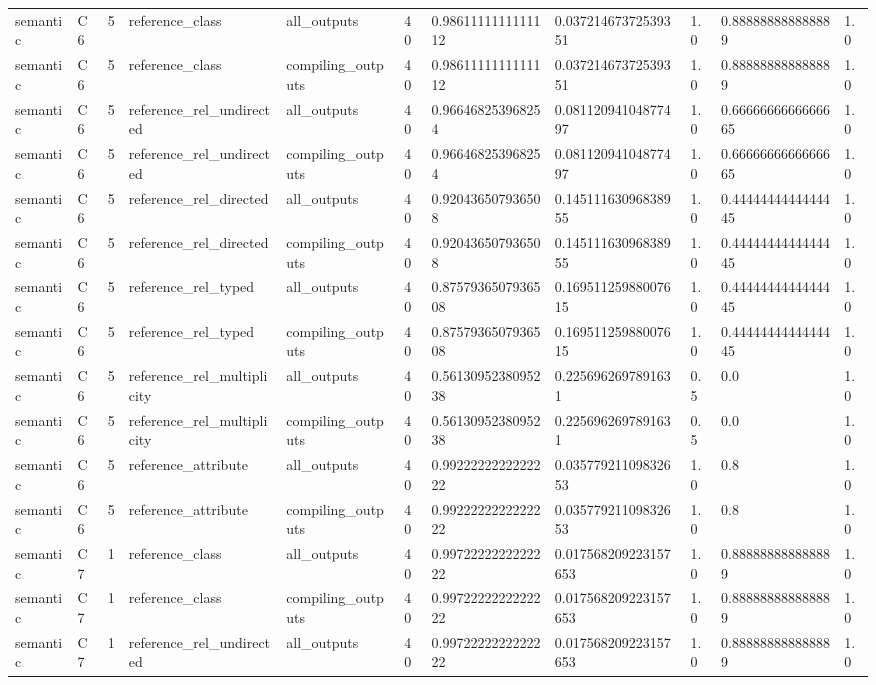 \begin{tabular}{lllllllllll}
semantic & C6 & 5 & reference\_class & all\_outputs & 40 & 0.9861111111111112 & 0.03721467372539351 & 1.0 & 0.888888888888889 & 1.0 \\
semantic & C6 & 5 & reference\_class & compiling\_outputs & 40 & 0.9861111111111112 & 0.03721467372539351 & 1.0 & 0.888888888888889 & 1.0 \\
semantic & C6 & 5 & reference\_rel\_undirected & all\_outputs & 40 & 0.966468253968254 & 0.08112094104877497 & 1.0 & 0.6666666666666665 & 1.0 \\
semantic & C6 & 5 & reference\_rel\_undirected & compiling\_outputs & 40 & 0.966468253968254 & 0.08112094104877497 & 1.0 & 0.6666666666666665 & 1.0 \\
semantic & C6 & 5 & reference\_rel\_directed & all\_outputs & 40 & 0.920436507936508 & 0.14511163096838955 & 1.0 & 0.4444444444444445 & 1.0 \\
semantic & C6 & 5 & reference\_rel\_directed & compiling\_outputs & 40 & 0.920436507936508 & 0.14511163096838955 & 1.0 & 0.4444444444444445 & 1.0 \\
semantic & C6 & 5 & reference\_rel\_typed & all\_outputs & 40 & 0.8757936507936508 & 0.16951125988007615 & 1.0 & 0.4444444444444445 & 1.0 \\
semantic & C6 & 5 & reference\_rel\_typed & compiling\_outputs & 40 & 0.8757936507936508 & 0.16951125988007615 & 1.0 & 0.4444444444444445 & 1.0 \\
semantic & C6 & 5 & reference\_rel\_multiplicity & all\_outputs & 40 & 0.5613095238095238 & 0.2256962697891631 & 0.5 & 0.0 & 1.0 \\
semantic & C6 & 5 & reference\_rel\_multiplicity & compiling\_outputs & 40 & 0.5613095238095238 & 0.2256962697891631 & 0.5 & 0.0 & 1.0 \\
semantic & C6 & 5 & reference\_attribute & all\_outputs & 40 & 0.9922222222222222 & 0.03577921109832653 & 1.0 & 0.8 & 1.0 \\
semantic & C6 & 5 & reference\_attribute & compiling\_outputs & 40 & 0.9922222222222222 & 0.03577921109832653 & 1.0 & 0.8 & 1.0 \\
semantic & C7 & 1 & reference\_class & all\_outputs & 40 & 0.9972222222222222 & 0.017568209223157653 & 1.0 & 0.888888888888889 & 1.0 \\
semantic & C7 & 1 & reference\_class & compiling\_outputs & 40 & 0.9972222222222222 & 0.017568209223157653 & 1.0 & 0.888888888888889 & 1.0 \\
semantic & C7 & 1 & reference\_rel\_undirected & all\_outputs & 40 & 0.9972222222222222 & 0.017568209223157653 & 1.0 & 0.888888888888889 & 1.0 \\

\end{tabular}
